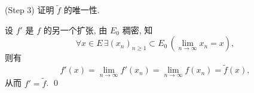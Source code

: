 \begin{Prf}
     (Step 3) 证明 $ \tilde{f} $ 的唯一性. 
     
     设 $ {f}' $ 是 $ f $ 的另一个扩张, 由 $ E_{0} $ 稠密, 知
     \[
          \forall x\in E\,\exists (x_{n})_{n\geqslant1} \subset E_{0}\,(\lim_{n\to\infty}x_{n}=x),
     \]
     则有
     \[
          f'(x)=\lim_{n\to\infty}f'(x_{n})=\lim_{n\to\infty}f(x_{n})=\tilde{f}(x), 
     \]
     从而 $ f'=\tilde{f} $. \qed
\end{Prf}